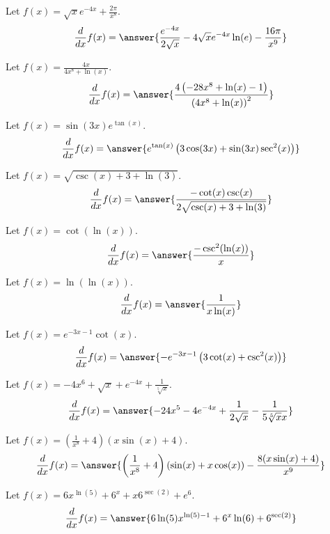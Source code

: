 \documentclass{ximera}
\begin{document}
\begin{shuffle}
\begin{exercise}
Let $f(x)=\sqrt{x} e^{-4 x}+\frac{2 \pi }{x^8}$.
\[
\ddx f(x) = \answer{\frac{e^{-4 x}}{2 \sqrt{x}}-4 \sqrt{x} e^{-4 x} \ln (e)-\frac{16 \pi }{x^9}}
\]
\end{exercise}

\begin{exercise}
Let $f(x)=\frac{4 x}{4 x^8+\ln (x)}$.
\[
\ddx f(x) = \answer{\frac{4 \left(-28 x^8+\ln (x)-1\right)}{\left(4 x^8+\ln (x)\right)^2}}
\]
\end{exercise}

\begin{exercise}
Let $f(x)=\sin (3 x) e^{\tan (x)}$.
\[
\ddx f(x) = \answer{e^{\tan (x)} \left(3 \cos (3 x)+\sin (3 x) \sec ^2(x)\right)}
\]
\end{exercise}

\begin{exercise}
Let $f(x)=\sqrt{\csc (x)+3+\ln (3)}$.
\[
\ddx f(x) = \answer{\frac{-\cot (x) \csc (x)}{2 \sqrt{\csc (x)+3+\ln (3)}}}
\]
\end{exercise}

\begin{exercise}
Let $f(x)=\cot (\ln (x))$.
\[
\ddx f(x) = \answer{\frac{-\csc ^2(\ln (x))}{x}}
\]
\end{exercise}

\begin{exercise}
Let $f(x)=\ln (\ln (x))$.
\[
\ddx f(x) = \answer{\frac{1}{x \ln (x)}}
\]
\end{exercise}

\begin{exercise}
Let $f(x)=e^{-3 x-1} \cot (x)$.
\[
\ddx f(x) = \answer{-e^{-3 x-1} \left(3 \cot (x)+\csc ^2(x)\right)}
\]
\end{exercise}

\begin{exercise}
Let $f(x)=-4 x^6+\sqrt{x}+e^{-4 x}+\frac{1}{\sqrt[5]{x}}$.
\[
\ddx f(x) = \answer{-24 x^5-4 e^{-4 x}+\frac{1}{2 \sqrt{x}}-\frac{1}{5 \sqrt[5]{x} x}}
\]
\end{exercise}

\begin{exercise}
Let $f(x)=\left(\frac{1}{x^8}+4\right) (x \sin (x)+4)$.
\[
\ddx f(x) = \answer{\left(\frac{1}{x^8}+4\right) (\sin (x)+x \cos (x))-\frac{8 (x \sin (x)+4)}{x^9}}
\]
\end{exercise}

\begin{exercise}
Let $f(x)=6 x^{\ln (5)}+6^x+x 6^{\sec (2)}+e^6$.
\[
\ddx f(x) = \answer{6 \ln (5) x^{\ln (5)-1}+6^x \ln (6)+6^{\sec (2)}}
\]
\end{exercise}


\end{shuffle}
\end{document}
